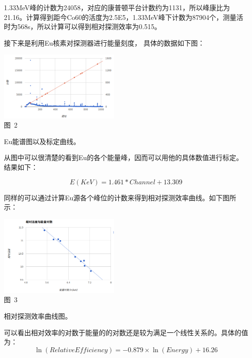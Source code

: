 \documentclass[a4paper,10.0pt,twoside]{npr}
\begin{document}
\begin{multicols}{2}
1.33MeV峰的计数为24058，对应的康普顿平台计数约为1131，所以峰康比为21.16。计算得到距今Co60的活度为2.5E5，1.33MeV峰下计数为87904个，测量活时为568s，所以计算可以得到相对探测效率为0.515。

接下来是利用Eu核素对探测器进行能量刻度， 具体的数据如下图：
\begin{center}
   \includegraphics[width=0.45\textwidth]{2.png}
\\
\xiaowu\song 图~2\begin{minipage}[t]{75mm} \quad Eu能谱图以及标定曲线。\\[-1mm]\wuhao
\end{minipage}
\end{center}

从图中可以很清楚的看到Eu的各个能量峰，因而可以用他的具体数值进行标定。结果如下：

\begin{equation}
	E(KeV)=1.461*Channel +13.309
\end{equation}

同样的可以通过计算Eu源各个峰位的计数来得到相对探测效率曲线。如下图所示：
\begin{center}
   \includegraphics[width=0.45\textwidth]{3.png}
\\
\xiaowu\song 图~3\begin{minipage}[t]{75mm} \quad 相对探测效率曲线图。\\[-1mm]\wuhao
\end{minipage}
\end{center}

可以看出相对效率的对数于能量的的对数还是较为满足一个线性关系的。具体的值为：
\begin{equation}
	\ln(Relative Efficiency)=-0.879\times \ln(Energy)+16.26
\end{equation}


\end{multicols}
\end{document}
